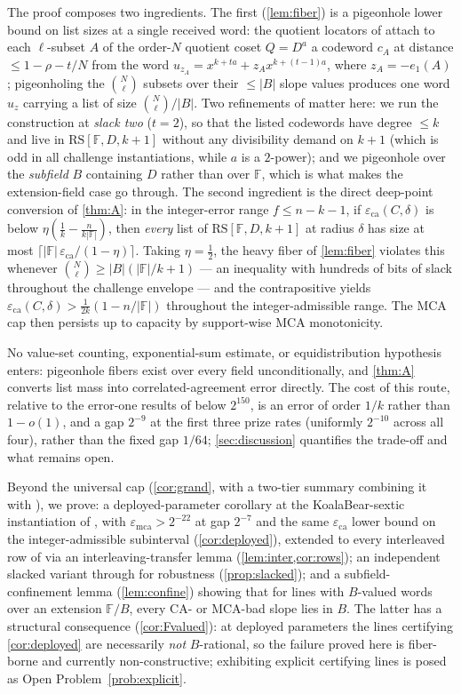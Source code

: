 \documentclass[11pt]{article}
\theoremstyle{definition}
\theoremstyle{remark}
\newcommand{\F}{\mathbb{F}}
\newcommand{\B}{B}
\newcommand{\RS}{\mathrm{RS}}
\newcommand{\eca}{\varepsilon_{\mathrm{ca}}}
\newcommand{\emca}{\varepsilon_{\mathrm{mca}}}
\newcommand{\eone}{e_1}
\begin{document}
The proof composes two ingredients. The first (\cref{lem:fiber}) is a pigeonhole lower bound on list sizes at a single received word: the quotient locators of \cite{Cho26a} attach to each $\ell$-subset $A$ of the order-$N$ quotient coset $Q=D^{a}$ a codeword $c_A$ at distance $\le1-\rho-t/N$ from the word $u_{z_A}=x^{k+ta}+z_Ax^{k+(t-1)a}$, where $z_A=-\eone(A)$; pigeonholing the $\binom N\ell$ subsets over their $\le|\B|$ slope values produces one word $u_z$ carrying a list of size $\binom N\ell/|\B|$. Two refinements of \cite[Main Thm.\,(d)]{Cho26a} matter here: we run the construction at \emph{slack two} ($t=2$), so that the listed codewords have degree $\le k$ and live in $\RS[\F,D,k+1]$ without any divisibility demand on $k+1$ (which is odd in all challenge instantiations, while $a$ is a $2$-power); and we pigeonhole over the \emph{subfield} $\B$ containing $D$ rather than over $\F$, which is what makes the extension-field case go through. The second ingredient is the direct deep-point conversion of \cref{thm:A}: in the integer-error range $f\le n-k-1$, if $\eca(C,\delta)$ is below $\eta(\frac1k-\frac n{k|\F|})$, then \emph{every} list of $\RS[\F,D,k+1]$ at radius $\delta$ has size at most $\lceil|\F|\,\eca/(1-\eta)\rceil$. Taking $\eta=\frac12$, the heavy fiber of \cref{lem:fiber} violates this whenever $\binom N\ell\ge|\B|(|\F|/k+1)$ --- an inequality with hundreds of bits of slack throughout the challenge envelope --- and the contrapositive yields $\eca(C,\delta)>\frac1{2k}(1-n/|\F|)$ throughout the integer-admissible range. The MCA cap then persists up to capacity by support-wise MCA monotonicity.

No value-set counting, exponential-sum estimate, or equidistribution hypothesis enters: pigeonhole fibers exist over every field unconditionally, and \cref{thm:A} converts list mass into correlated-agreement error directly. The cost of this route, relative to the error-one results of \cite{Cho26a,Cho26b} below $2^{150}$, is an error of order $1/k$ rather than $1-o(1)$, and a gap $2^{-9}$ at the first three prize rates (uniformly $2^{-10}$ across all four), rather than the fixed gap $1/64$; \cref{sec:discussion} quantifies the trade-off and what remains open.

Beyond the universal cap (\cref{cor:grand}, with a two-tier summary combining it with \cite{Cho26b}), we prove: a deployed-parameter corollary at the KoalaBear-sextic instantiation of \cite[\S6.3]{ABF26}, with $\emca>2^{-22}$ at gap $2^{-7}$ and the same $\eca$ lower bound on the integer-admissible subinterval (\cref{cor:deployed}), extended to every interleaved row of \cite[Tables~2--3]{ABF26} via an interleaving-transfer lemma (\cref{lem:inter,cor:rows}); an independent slacked variant through \cite[Thm.~1.9]{BCHKS25} for robustness (\cref{prop:slacked}); and a subfield-confinement lemma (\cref{lem:confine}) showing that for lines with $\B$-valued words over an extension $\F/\B$, every CA- or MCA-bad slope lies in $\B$. The latter has a structural consequence (\cref{cor:Fvalued}): at deployed parameters the lines certifying \cref{cor:deployed} are necessarily \emph{not} $\B$-rational, so the failure proved here is fiber-borne and currently non-constructive; exhibiting explicit certifying lines is posed as Open Problem~\ref{prob:explicit}.
\end{document}
